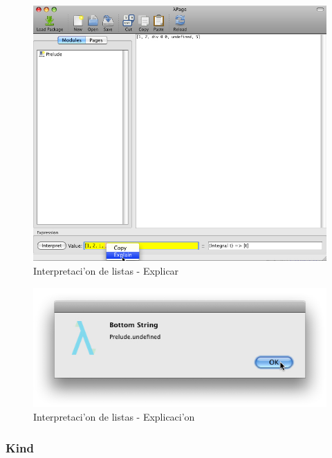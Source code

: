 \documentclass[a4paper]{article}
\begin{document}
\begin{figure}[hp]
	\begin{center}
        	\includegraphics[width=.75\textwidth]{pictures/lists02}
		\caption{Interpretaci'on de listas - Explicar}
		\label{etc2}
	\end{center}
\end{figure}
\begin{figure}[hp]
	\begin{center}
        	\includegraphics[width=.75\textwidth]{pictures/lists03}
		\caption{Interpretaci'on de listas - Explicaci'on}
		\label{etc3}
	\end{center}
\end{figure}

\newpage
\subsubsection{Kind}
\end{document}
